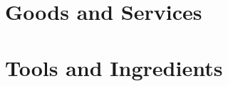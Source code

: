 \chapter{Goods and Services}\label{ch:goodsAndServices}

	

	

	

	

	



\chapter{Tools and Ingredients}\label{sec:craftingItems}

	

	